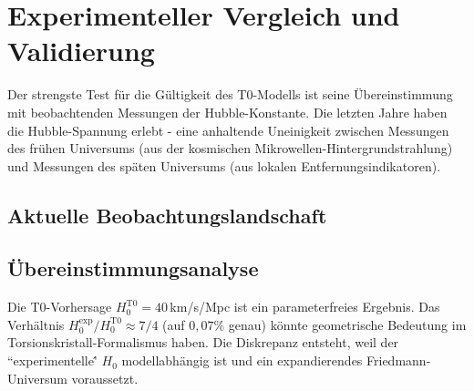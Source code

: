\documentclass[12pt,a4paper]{article}
\begin{document}
	\section{Experimenteller Vergleich und Validierung}
	
	Der strengste Test für die Gültigkeit des T0-Modells ist seine Übereinstimmung mit beobachtenden Messungen der Hubble-Konstante. Die letzten Jahre haben die Hubble-Spannung erlebt - eine anhaltende Uneinigkeit zwischen Messungen des frühen Universums (aus der kosmischen Mikrowellen-Hintergrundstrahlung) und Messungen des späten Universums (aus lokalen Entfernungsindikatoren).
	
	\subsection{Aktuelle Beobachtungslandschaft}
	
	\begin{table}[htbp]
		\caption{Vergleich der T0-Vorhersage mit experimentellen Messungen}
		\label{tab:h0_comparison}
	\end{table}
	
	\subsection{Übereinstimmungsanalyse}
	
	Die T0-Vorhersage $H_0^{\text{T0}} = 40\,$km/s/Mpc ist ein parameterfreies Ergebnis. Das Verhältnis $H_0^{\text{exp}}/H_0^{\text{T0}} \approx 7/4$ (auf $0{,}07\%$ genau) könnte geometrische Bedeutung im Torsionskristall-Formalismus haben. Die Diskrepanz entsteht, weil der ``experimentelle\'\' $H_0$ modellabhängig ist und ein expandierendes Friedmann-Universum voraussetzt.
	
\end{document}
